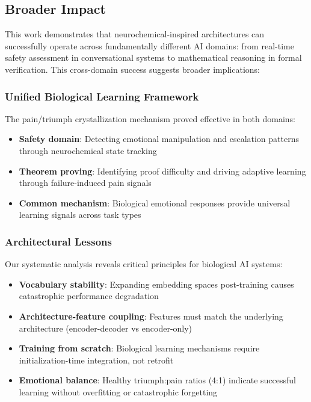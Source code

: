 \documentclass[12pt]{article}
\begin{document}
\subsection{Broader Impact}

This work demonstrates that neurochemical-inspired architectures can successfully operate across fundamentally different AI domains: from real-time safety assessment in conversational systems to mathematical reasoning in formal verification. This cross-domain success suggests broader implications:

\subsubsection{Unified Biological Learning Framework}

The pain/triumph crystallization mechanism proved effective in both domains:
\begin{itemize}
\item \textbf{Safety domain}: Detecting emotional manipulation and escalation patterns through neurochemical state tracking
\item \textbf{Theorem proving}: Identifying proof difficulty and driving adaptive learning through failure-induced pain signals
\item \textbf{Common mechanism}: Biological emotional responses provide universal learning signals across task types
\end{itemize}

\subsubsection{Architectural Lessons}

Our systematic analysis reveals critical principles for biological AI systems:
\begin{itemize}
\item \textbf{Vocabulary stability}: Expanding embedding spaces post-training causes catastrophic performance degradation
\item \textbf{Architecture-feature coupling}: Features must match the underlying architecture (encoder-decoder vs encoder-only)
\item \textbf{Training from scratch}: Biological learning mechanisms require initialization-time integration, not retrofit
\item \textbf{Emotional balance}: Healthy triumph:pain ratios (4:1) indicate successful learning without overfitting or catastrophic forgetting
\end{itemize}
\end{document}
